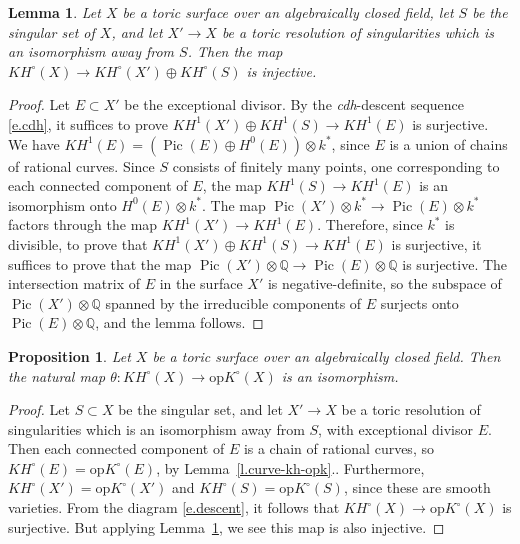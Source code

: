 \documentclass[11pt]{amsart}
\newtheorem{lemma}[theorem]{Lemma}
\newtheorem{proposition}[theorem]{Proposition}
\theoremstyle{definition}
\begin{document}
\begin{lemma}\label{l.surface-kh}
Let $X$ be a toric surface over an algebraically closed field, let $S$ be the singular set of $X$, and let $X' \to X$ be a toric resolution of singularities which is an isomorphism away from $S$.  Then the map $KH^\circ(X) \to KH^\circ(X') \oplus KH^\circ(S)$ is injective.
\end{lemma}

\begin{proof}
Let $E\subset X'$ be the exceptional divisor.  By the {\em cdh}-descent sequence \eqref{e.cdh}, it suffices to prove $KH^1(X') \oplus KH^1(S) \to KH^1(E)$ is surjective.  We have $KH^1(E) = (\operatorname{Pic}(E) \oplus H^0(E))\otimes k^*$, since $E$ is a union of chains of rational curves.  Since $S$ consists of finitely many points, one corresponding to each connected component of $E$, the map $KH^1(S) \to KH^1(E)$ is an isomorphism onto $H^0(E)\otimes k^*$.  The map $\operatorname{Pic}(X')\otimes k^* \to \operatorname{Pic}(E)\otimes k^*$ factors through the map $KH^1(X') \to KH^1(E)$.  Therefore, since $k^*$ is divisible, to prove that $KH^1(X') \oplus KH^1(S) \rightarrow KH^1(E)$ is surjective, it suffices to prove that the map $\operatorname{Pic}(X')\otimes {\mathbb{Q}} \to \operatorname{Pic}(E)\otimes {\mathbb{Q}}$ is surjective.  
The intersection matrix of $E$ in the surface $X'$ is negative-definite, so the subspace of $\operatorname{Pic}(X')\otimes{\mathbb{Q}}$ spanned by the irreducible components of $E$ surjects onto $\operatorname{Pic}(E)\otimes{\mathbb{Q}}$, and the lemma follows.
\end{proof}

\begin{proposition}\label{p.surface-kh-opk}
Let $X$ be a toric surface over an algebraically closed field.  Then the natural map $\theta: KH^\circ(X) \to {\mathrm{op}K}^\circ(X)$ is an isomorphism.
\end{proposition}

\begin{proof}
Let $S \subset X$ be the singular set, and let $X' \to X$ be a toric resolution of singularities which is an isomorphism away from $S$, with exceptional divisor $E$.  Then each connected component of $E$ is a chain of rational curves, so $KH^\circ(E) = {\mathrm{op}K}^\circ(E)$, by Lemma~\ref{l.curve-kh-opk}..  Furthermore, $KH^\circ(X') = {\mathrm{op}K}^\circ(X')$ and $KH^\circ(S)={\mathrm{op}K}^\circ(S)$, since these are smooth varieties.  From the diagram \eqref{e.descent}, it follows that $KH^\circ(X) \to {\mathrm{op}K}^\circ(X)$ is surjective.  But applying Lemma~\ref{l.surface-kh}, we see this map is also injective.
\end{proof}
\end{document}
